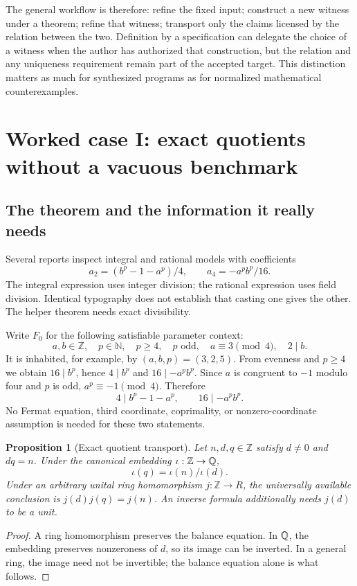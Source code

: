 \documentclass[11pt,letterpaper]{article}
\newcommand{\Z}{\mathbb Z}\newcommand{\N}{\mathbb N}
\newtheorem{proposition}{Proposition}[section]
\theoremstyle{definition}\newtheorem{definition}[proposition]{Definition}
\theoremstyle{remark}\newtheorem{remark}[proposition]{Remark}
\begin{document}
The general workflow is therefore: refine the fixed input; construct a new
witness under a theorem; refine that witness; transport only the claims licensed
by the relation between the two. Definition by a specification can delegate
the choice of a witness when the author has authorized that construction, but
the relation and any uniqueness requirement remain part of the accepted target.
This distinction matters as much for synthesized programs as for normalized
mathematical counterexamples.

\section{Worked case I: exact quotients without a vacuous benchmark}\label{sec:quotients}

\subsection{The theorem and the information it really needs}
Several reports inspect integral and rational models with coefficients
\[
 a_2=(b^p-1-a^p)/4,\qquad a_4=-a^pb^p/16.
\]
The integral expression uses integer division; the rational expression uses
field division. Identical typography does not establish that casting one gives
the other. The helper theorem needs exact divisibility.

Write $F_0$ for the following satisfiable parameter context:
\begin{equation}\label{eq:frey-context}
 a,b\in\Z,\quad p\in\N,\quad p\ge4,\quad p\text{ odd},
 \quad a\equiv3\pmod4,\quad 2\mid b.
\end{equation}
It is inhabited, for example, by $(a,b,p)=(3,2,5)$. From evenness and $p\ge4$
we obtain $16\mid b^p$, hence $4\mid b^p$ and $16\mid-a^pb^p$. Since $a$ is
congruent to $-1$ modulo four and $p$ is odd, $a^p\equiv-1\pmod4$.
Therefore
\[
 4\mid b^p-1-a^p,\qquad 16\mid-a^pb^p.
\]
No Fermat equation, third coordinate, coprimality, or nonzero-coordinate
assumption is needed for these two statements.

\begin{proposition}[Exact quotient transport]
Let $n,d,q\in\Z$ satisfy $d\ne0$ and $dq=n$. Under the canonical embedding
$\iota:\Z\to\Q$,
\[
 \iota(q)=\iota(n)/\iota(d).
\]
Under an arbitrary unital ring homomorphism $j:\Z\to R$, the universally
available conclusion is $j(d)j(q)=j(n)$. An inverse formula additionally needs
$j(d)$ to be a unit.
\end{proposition}
\begin{proof}
A ring homomorphism preserves the balance equation. In $\mathbb Q$, the embedding
preserves nonzeroness of $d$, so its image can be inverted. In a general ring,
the image need not be invertible; the balance equation alone is what follows.
\end{proof}
\end{document}
